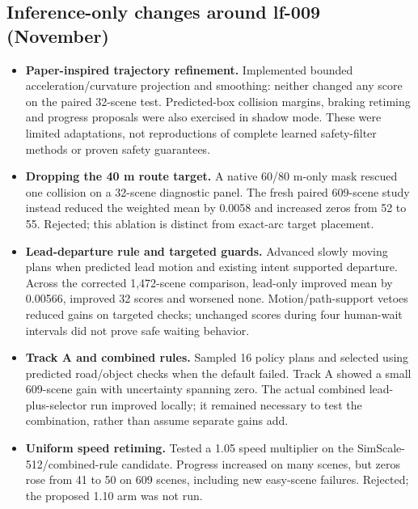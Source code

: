\subsection{Inference-only changes around lf-009 (November)}
\begin{itemize}\setlength{\itemsep}{3pt}\setlength{\parsep}{0pt}\setlength{\parskip}{0pt}\setlength{\topsep}{3pt}
\item \textbf{Paper-inspired trajectory refinement.} Implemented bounded acceleration/curvature projection and smoothing: neither changed any score on the paired 32-scene test. Predicted-box collision margins, braking retiming and progress proposals were also exercised in shadow mode. These were limited adaptations, not reproductions of complete learned safety-filter methods or proven safety guarantees.
\item \textbf{Dropping the 40 m route target.} A native 60/80 m-only mask rescued one collision on a 32-scene diagnostic panel. The fresh paired 609-scene study instead reduced the weighted mean by 0.0058 and increased zeros from 52 to 55. Rejected; this ablation is distinct from exact-arc target placement.
\item \textbf{Lead-departure rule and targeted guards.} Advanced slowly moving plans when predicted lead motion and existing intent supported departure. Across the corrected 1,472-scene comparison, lead-only improved mean by 0.00566, improved 32 scores and worsened none. Motion/path-support vetoes reduced gains on targeted checks; unchanged scores during four human-wait intervals did not prove safe waiting behavior.
\item \textbf{Track A and combined rules.} Sampled 16 policy plans and selected using predicted road/object checks when the default failed. Track A showed a small 609-scene gain with uncertainty spanning zero. The actual combined lead-plus-selector run improved locally; it remained necessary to test the combination, rather than assume separate gains add.
\item \textbf{Uniform speed retiming.} Tested a 1.05 speed multiplier on the SimScale-512/combined-rule candidate. Progress increased on many scenes, but zeros rose from 41 to 50 on 609 scenes, including new easy-scene failures. Rejected; the proposed 1.10 arm was not run.

\end{itemize}
